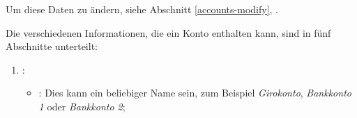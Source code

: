 Um diese Daten zu ändern, siehe Abschnitt \vref{accounts-modify}, .

Die verschiedenen Informationen, die ein Konto enthalten kann, sind in fünf Abschnitte unterteilt:

\begin{enumerate}
	\item {}:
	\begin{itemize}
		\item {}: Dies kann ein beliebiger Name sein, zum Beispiel \emph{Girokonto}, \emph{Bankkonto 1} oder \emph{Bankkonto 2};
		
		

\end{itemize}
\end{enumerate}
